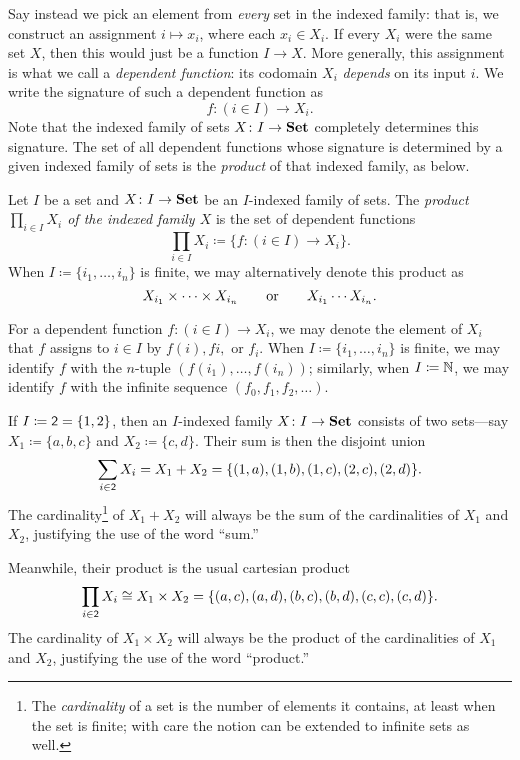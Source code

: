 \documentclass[Book-Poly]{subfiles}
\begin{document}
Say instead we pick an element from \emph{every} set in the indexed family: that is, we construct an assignment $i\mapsto x_i$, where each $x_i\in X_i$.
If every $X_i$ were the same set $X$, then this would just be a function $I\to X$.
More generally, this assignment is what we call a \emph{dependent function}: its codomain $X_i$ \emph{depends} on its input $i$.
We write the signature of such a dependent function as
\[
f \colon (i \in I) \to X_i.
\]
Note that the indexed family of sets $X\colon I\to\mathbf{Set}$ completely determines this signature.
The set of all dependent functions whose signature is determined by a given indexed family of sets is the \emph{product} of that indexed family, as below.

\begin{definition} \label{def.prod_sets}
    Let $I$ be a set and $X\colon I\to\mathbf{Set}$ be an $I$-indexed family of sets.
    The \emph{product $\prod_{i\in I}X_i$ of the indexed family $X$} is the set of dependent functions
    \[
    \prod_{i\in I}X_i\coloneqq\{f \colon (i \in I) \to X_i\}.
    \]
    When $I\coloneqq\{i_1,\ldots,i_n\}$ is finite, we may alternatively denote this product as
    \[
    X_{i_1}\times\cdots\times X_{i_n} \qquad\text{or}\qquad X_{i_1}\cdots X_{i_n}.
    \]
\end{definition}

For a dependent function $f\colon(i\in I)\to X_i$, we may denote the element of $X_i$ that $f$ assigns to $i\in I$ by $f(i), fi,$ or $f_i$.
When $I\coloneqq\{i_1,\ldots,i_n\}$ is finite, we may identify $f$ with the $n$-tuple $(f(i_1),\ldots,f(i_n))$; similarly, when $I\coloneqq\mathbb{N}$, we may identify $f$ with the infinite sequence $(f_0,f_1,f_2,\ldots)$.

\begin{example}\label{ex.two_sums_and_prods}
    If $I\coloneqq\textsf{2}=\{1,2\}$, then an $I$-indexed family $X\colon I\to \mathbf{Set}$ consists of two sets---say $X_1\coloneqq\{a,b,c\}$ and $X_2\coloneqq\{c,d\}$.
    Their sum is then the disjoint union
    \[
    \sum_{i\in \textsf{2}}X_i=X_1+X_2=\{(1,a),(1,b),(1,c),(2,c),(2,d)\}.
    \]
    The cardinality\footnote{The \emph{cardinality} of a set is the number of elements it contains, at least when the set is finite; with care the notion can be extended to infinite sets as well.} of $X_1+X_2$ will always be the sum of the cardinalities of $X_1$ and $X_2$, justifying the use of the word ``sum.''

    Meanwhile, their product is the usual cartesian product
    \[\prod_{i\in \textsf{2}}X_i \cong X_1\times X_2=\{(a,c),(a,d),(b,c),(b,d),(c,c),(c,d)\}.\]
    The cardinality of $X_1\times X_2$ will always be the product of the cardinalities of $X_1$ and $X_2$, justifying the use of the word ``product.''
\end{example}
\end{document}

